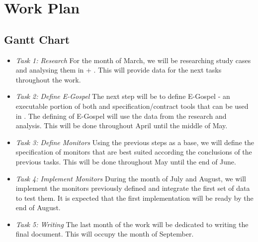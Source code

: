 
%

\chapter{Work Plan}
\label{cha:work_plan}

\section{Gantt Chart}
\label{section:gantt_chart}

\begin{itemize}
    \setlength\itemsep{0bp}
    \item{\emph{Task 1: Research}}\hspace{1em}
    For the month of March, we will be researching study cases and analysing them in 
    \ortac + \cameleer. This will provide data for the next tasks throughout the work.
    \item{\emph{Task 2: Define E-Gospel}}\hspace{1em}
    The next step will be to define E-Gospel - an executable portion of both \ocaml and 
    specification/contract tools that can be used in \gospellang. The defining of E-Gospel 
    will use the data from the research and analysis. This will be done throughout April 
    until the middle of May.
    \item{\emph{Task 3: Define Monitors}}\hspace{1em}
    Using the previous steps as a base, we will define the specification of monitors that 
    are best suited according the conclusions of the previous tasks. This will be done 
    throughout May until the end of June.
    \item{\emph{Task 4: Implement Monitors}}\hspace{1em}
    During the month of July and August, we will implement the monitors previously defined 
    and integrate the first set of data to test them. It is expected that the first 
    implementation will be ready by the end of August.
    \item{\emph{Task 5: Writing}}\hspace{1em}
    The last month of the work will be dedicated to writing the final document. This will
    occupy the month of September.
\end{itemize}

